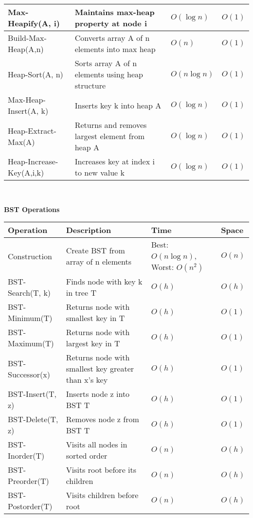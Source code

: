 {{\begin{minipage}[t]{0.47\textwidth}
\begin{tabular}{|p{}|p{}|p{}|p{}|}
Max-Heapify(A, i) & Maintains max-heap property at node i & $O(\log n)$ & $O(1)$ \\
\hline
Build-Max-Heap(A,n) & Converts array A of n elements into max heap & $O(n)$ & $O(1)$ \\
\hline
Heap-Sort(A, n) & Sorts array A of n elements using heap structure & $O(n \log n)$ & $O(1)$ \\
\hline
Max-Heap-Insert(A, k) & Inserts key k into heap A & $O(\log n)$ & $O(1)$ \\
\hline
Heap-Extract-Max(A) & Returns and removes largest element from heap A & $O(\log n)$ & $O(1)$ \\
\hline
Heap-Increase-Key(A,i,k) & Increases key at index i to new value k & $O(\log n)$ & $O(1)$ \\
\hline
\end{tabular}\\
\end{minipage}
\hspace{-37px}
\begin{minipage}[t]{0.54\textwidth}
\tiny
\textbf{BST Operations}\\
\begin{tabular}{|p{}|p{}|p{}|p{}|}
\hline
\textbf{Operation} & \textbf{Description} & \textbf{Time} & \textbf{Space} \\
\hline
Construction & Create BST from array of n elements & Best: $O(n\log n)$, Worst: $O(n^2)$ & $O(n)$ \\
\hline
BST-Search(T, k) & Finds node with key k in tree T & $O(h)$ & $O(h)$ \\
\hline
BST-Minimum(T) & Returns node with smallest key in T & $O(h)$ & $O(1)$ \\
\hline
BST-Maximum(T) & Returns node with largest key in T & $O(h)$ & $O(1)$ \\
\hline
BST-Successor(x) & Returns node with smallest key greater than x's key & $O(h)$ & $O(1)$ \\
\hline
BST-Insert(T, z) & Inserts node z into BST T & $O(h)$ & $O(1)$ \\
\hline
BST-Delete(T, z) & Removes node z from BST T & $O(h)$ & $O(1)$ \\
\hline
BST-Inorder(T) & Visits all nodes in sorted order & $O(n)$ & $O(h)$ \\
\hline
BST-Preorder(T) & Visits root before its children & $O(n)$ & $O(h)$ \\
\hline
BST-Postorder(T) & Visits children before root & $O(n)$ & $O(h)$ \\

\end{tabular}
\end{minipage}}}
